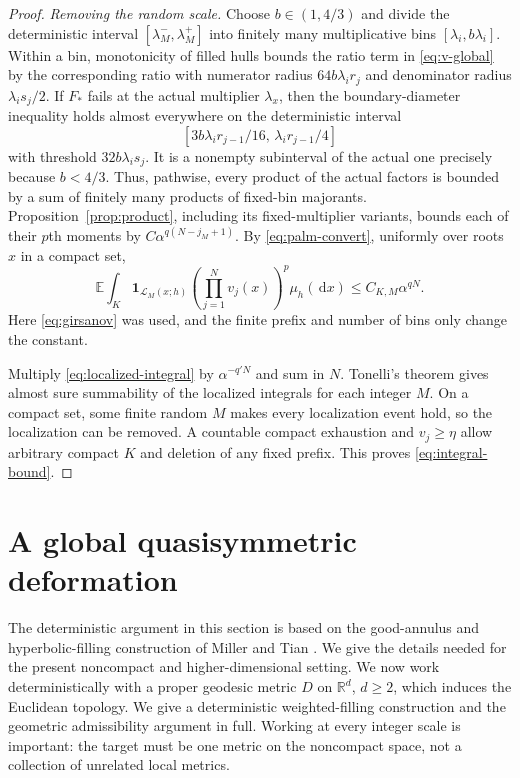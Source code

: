 \documentclass[11pt,reqno]{amsart}
\theoremstyle{plain}
\theoremstyle{definition}
\theoremstyle{remark}
\newcommand{\R}{\mathbb R}
\newcommand{\E}{\mathbb E}
\newcommand{\1}{\mathbf{1}}
\newcommand{\dd}{\,\mathrm d}
\begin{document}
\begin{proof}
\emph{Removing the random scale.} Choose $b\in(1,4/3)$ and divide the deterministic interval $[\lambda_M^-,\lambda_M^+]$ into finitely many multiplicative bins $[\lambda_i,b\lambda_i]$. Within a bin, monotonicity of filled hulls bounds the ratio term in \eqref{eq:v-global} by the corresponding ratio with numerator radius $64b\lambda_i r_j$ and denominator radius $\lambda_i s_j/2$. If $F_*$ fails at the actual multiplier $\lambda_x$, then the boundary-diameter inequality holds almost everywhere on the deterministic interval
\[
[3b\lambda_i r_{j-1}/16,\,\lambda_i r_{j-1}/4]
\]
with threshold $32b\lambda_i s_j$. It is a nonempty subinterval of the actual one precisely because $b<4/3$. Thus, pathwise, every product of the actual factors is bounded by a sum of finitely many products of fixed-bin majorants. Proposition~\ref{prop:product}, including its fixed-multiplier variants, bounds each of their $p$th moments by $C\alpha^{q(N-j_M+1)}$. By \eqref{eq:palm-convert}, uniformly over roots $x$ in a compact set,
\begin{equation}\label{eq:localized-integral}
\E\int_K\1_{\mathcal L_M(x;h)}\left(\prod_{j=1}^N v_j(x)\right)^p\mu_h(\dd x)
\le C_{K,M}\alpha^{qN}.
\end{equation}
Here \eqref{eq:girsanov} was used, and the finite prefix and number of bins only change the constant.

Multiply \eqref{eq:localized-integral} by $\alpha^{-q'N}$ and sum in $N$. Tonelli's theorem gives almost sure summability of the localized integrals for each integer $M$. On a compact set, some finite random $M$ makes every localization event hold, so the localization can be removed. A countable compact exhaustion and $v_j\ge\eta$ allow arbitrary compact $K$ and deletion of any fixed prefix. This proves \eqref{eq:integral-bound}.
\end{proof}

\section{A global quasisymmetric deformation}\label{sec:global}
The deterministic argument in this section is based on the good-annulus and hyperbolic-filling construction of Miller and Tian \cite[Sections 5--6]{MT}. We give the details needed for the present noncompact and higher-dimensional setting.
We now work deterministically with a proper geodesic metric $D$ on $\R^d$, $d\ge2$, which induces the Euclidean topology. We give a deterministic weighted-filling construction and the geometric admissibility argument in full. Working at every integer scale is important: the target must be one metric on the noncompact space, not a collection of unrelated local metrics.
\end{document}
